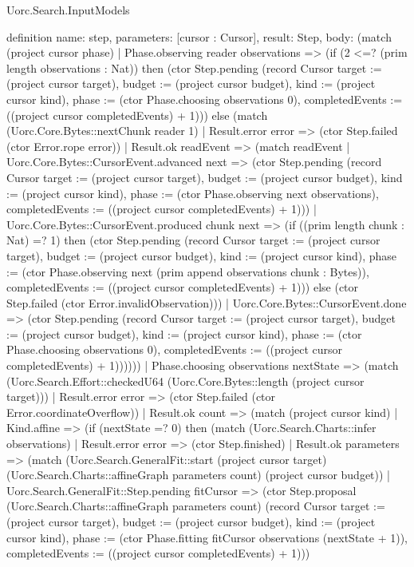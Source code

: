 \begin{lexlean}{Uorc.Search.InputModels}
\begin{semanticmodule}
definition{
  name: step,
  parameters: [cursor : Cursor],
  result: Step,
  body: (match (project cursor phase)
    | Phase.observing reader observations => (if (2 <=? (prim length observations : Nat)) then (ctor Step.pending (record Cursor {target := (project cursor target), budget := (project cursor budget), kind := (project cursor kind), phase := (ctor Phase.choosing observations 0), completedEvents := ((project cursor completedEvents) + 1)})) else (match (Uorc.Core.Bytes::nextChunk reader 1)
      | Result.error error => (ctor Step.failed (ctor Error.rope error))
      | Result.ok readEvent => (match readEvent
        | Uorc.Core.Bytes::CursorEvent.advanced next => (ctor Step.pending (record Cursor {target := (project cursor target), budget := (project cursor budget), kind := (project cursor kind), phase := (ctor Phase.observing next observations), completedEvents := ((project cursor completedEvents) + 1)}))
        | Uorc.Core.Bytes::CursorEvent.produced chunk next => (if ((prim length chunk : Nat) =? 1) then (ctor Step.pending (record Cursor {target := (project cursor target), budget := (project cursor budget), kind := (project cursor kind), phase := (ctor Phase.observing next (prim append observations chunk : Bytes)), completedEvents := ((project cursor completedEvents) + 1)})) else (ctor Step.failed (ctor Error.invalidObservation)))
        | Uorc.Core.Bytes::CursorEvent.done => (ctor Step.pending (record Cursor {target := (project cursor target), budget := (project cursor budget), kind := (project cursor kind), phase := (ctor Phase.choosing observations 0), completedEvents := ((project cursor completedEvents) + 1)})))))
    | Phase.choosing observations nextState => (match (Uorc.Search.Effort::checkedU64 (Uorc.Core.Bytes::length (project cursor target)))
      | Result.error error => (ctor Step.failed (ctor Error.coordinateOverflow))
      | Result.ok count => (match (project cursor kind)
        | Kind.affine => (if (nextState =? 0) then (match (Uorc.Search.Charts::infer observations)
          | Result.error error => (ctor Step.finished)
          | Result.ok parameters => (match (Uorc.Search.GeneralFit::start (project cursor target) (Uorc.Search.Charts::affineGraph parameters count) (project cursor budget))
            | Uorc.Search.GeneralFit::Step.pending fitCursor => (ctor Step.proposal (Uorc.Search.Charts::affineGraph parameters count) (record Cursor {target := (project cursor target), budget := (project cursor budget), kind := (project cursor kind), phase := (ctor Phase.fitting fitCursor observations (nextState + 1)), completedEvents := ((project cursor completedEvents) + 1)}))
}
\end{semanticmodule}
\end{lexlean}
